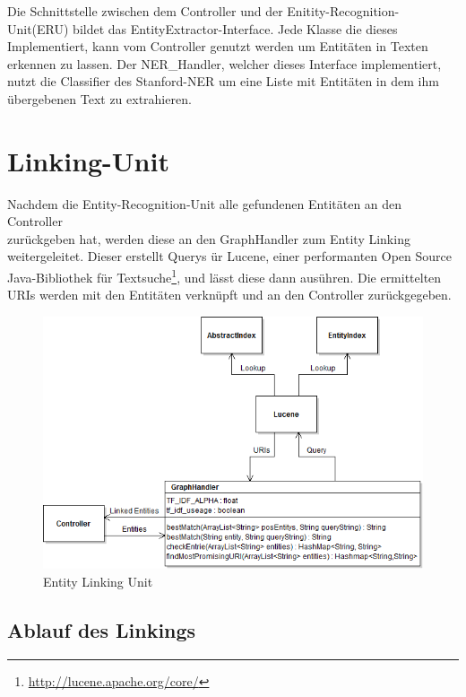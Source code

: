 \documentclass[11pt, a4paper, oneside]{Thesis} %
\begin{document}
Die Schnittstelle zwischen dem Controller und der Enitity-Recognition-Unit(ERU) bildet das EntityExtractor-Interface. Jede Klasse die dieses Implementiert, kann vom Controller genutzt werden um Entit\"aten in Texten erkennen zu lassen. Der NER\_Handler, welcher dieses Interface implementiert, nutzt die Classifier des Stanford-NER um eine Liste mit Entit\"aten in dem ihm \"ubergebenen Text zu extrahieren.

\section{Linking-Unit}
Nachdem die Entity-Recognition-Unit alle gefundenen Entit\"aten an den Controller\\ zurückgeben hat, werden diese an den GraphHandler zum Entity Linking weitergeleitet. Dieser erstellt Querys \"ur Lucene, einer performanten Open Source Java-Bibliothek f\"ur Textsuche\footnote{\url{http://lucene.apache.org/core/}}, und l\"asst diese dann aus\"uhren. Die ermittelten URIs werden mit den Entit\"aten verkn\"upft und an den Controller zur\"uckgegeben.
\begin{figure}[ht!]
\centering
\includegraphics[scale=0.55]{./entLinkImp.png}
\caption[Entity Linking Unit]{Entity Linking Unit}
\end{figure}

\subsection*{Ablauf des Linkings}
\end{document}
